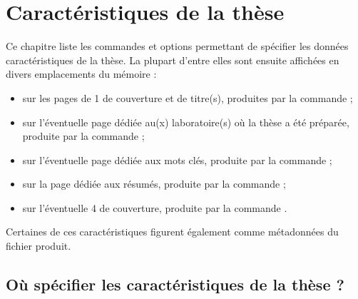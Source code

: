 \chapter{Caractéristiques de la thèse}
\label{cha-caract-du-docum}%
%

Ce chapitre liste les commandes et options permettant de spécifier les données
caractéristiques de la thèse. La plupart d'entre elles sont ensuite affichées
en divers emplacements du mémoire :
\begin{itemize}
\item%
  sur les pages de 1\iere{} de couverture et de titre(s), produites par la
  commande  ;
\item{}%
  sur l'éventuelle page dédiée au(x) laboratoire(s) où la thèse a été préparée,
  produite par la commande  ;
\item{}%
  sur l'éventuelle page dédiée aux mots clés, produite par la commande
   ;
\item{}%
  sur la page dédiée aux résumés, produite par la commande  ;
\item{}%
  sur l'éventuelle 4\ieme{} de couverture, produite par la commande
  .
\end{itemize}
Certaines de ces caractéristiques figurent également comme métadonnées du fichier
\pdf{} produit.

\section{Où spécifier les caractéristiques de la thèse ?}
\label{sec-lieu-de-saisie}%
%

